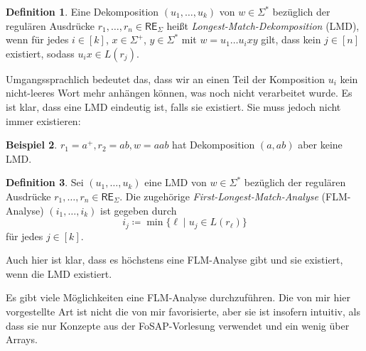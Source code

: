 \documentclass[11pt, a4paper]{article}
\theoremstyle{definition}
\newtheorem{definition}{Definition}[section]
\newtheorem{example}[definition]{Beispiel}
\theoremstyle{plain}
\numberwithin{equation}{section}
\begin{document}
\begin{definition}
	Eine Dekomposition $(u_1, \ldots, u_k)$ von $w \in \Sigma^\ast$ bezüglich der regulären Ausdrücke $r_1, \ldots, r_n \in \mathsf{RE}_\Sigma$ heißt \textit{Longest-Match-Dekomposition} (LMD), wenn für jedes $i \in [k]$, $x \in \Sigma^+$, $y \in \Sigma^\ast$ mit $w = u_1 \ldots u_i x y$ gilt, dass kein $j \in [n]$ existiert, sodass $u_i x \in L(r_j)$. 
\end{definition}
Umgangssprachlich bedeutet das, dass wir an einen Teil der Komposition $u_i$ kein nicht-leeres Wort mehr anhängen können, was noch nicht verarbeitet wurde.
Es ist klar, dass eine LMD eindeutig ist, falls sie existiert. Sie muss jedoch nicht immer existieren:

\begin{example}
	$r_1 = a^+, r_2 = ab, w = aab$ hat Dekomposition $(a, ab)$ aber keine LMD.
\end{example}

\begin{definition}
	Sei $(u_1, \ldots, u_k)$ eine LMD von $w \in \Sigma^\ast$ bezüglich der regulären Ausdrücke $r_1, \ldots, r_n \in \mathsf{RE}_\Sigma$. Die zugehörige \textit{First-Longest-Match-Analyse} (FLM-Analyse) $(i_1, \ldots, i_k)$ ist gegeben durch
	$$
		i_j \coloneqq \min \{ \ell \mid u_j \in L(r_\ell) \}
	$$
	für jedes $j \in [k]$.
\end{definition}
Auch hier ist klar, dass es höchstens eine FLM-Analyse gibt und sie existiert, wenn die LMD existiert.


Es gibt viele Möglichkeiten eine FLM-Analyse durchzuführen. Die von mir hier vorgestellte Art ist nicht die von mir favorisierte, aber sie ist insofern intuitiv, als dass sie nur Konzepte aus der FoSAP-Vorlesung verwendet und ein wenig über Arrays.
\end{document}
